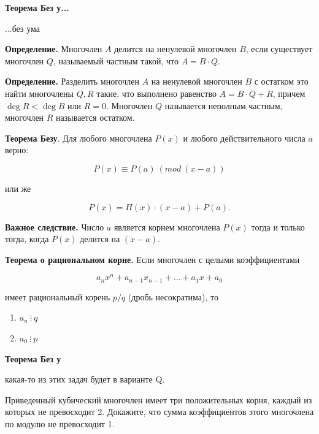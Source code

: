 \centerline{\bf \Huge Теорема Без у...}
\centerline{\bf \Huge }

\begin{flushright}
        \scriptsize{...без ума}
\end{flushright}

\textbf{Определение.} Многочлен $A$ делится на ненулевой многочлен $B$, если существует многочлен $Q$, называемый частным такой, что $A=B \cdot Q$.

\textbf{Определение.} Разделить многочлен $A$ на ненулевой многочлен $B$ с остатком это найти многочлены $Q, R$ такие, что выполнено равенство $A=B \cdot Q+R$, причем $\operatorname{deg} R<\operatorname{deg} B$ или $R=0$. Многочлен $Q$ называется неполным частным, многочлен $R$ называется остатком.

\textbf{Теорема Безу}. Для любого многочлена $P(x)$ и любого действительного числа $a$ верно:

$$
P(x) \equiv P(a) \ (mod \ (x-a))
$$

или же 

$$
P(x)=H(x) \cdot(x-a)+P(a) .
$$


\textbf{Важное следствие.} Число $a$ является корнем многочлена $P(x)$ тогда и только тогда, когда $P(x)$ делится на $(x-a)$.

\textbf{Теорема о рациональном корне.} Если многочлен с целыми коэффициентами

$$
a_n x^n+a_{n-1}x_{n-1}+\ldots+a_{1} x+a_0
$$


имеет рациональный корень $p / q$ (дробь несократима), то 

\begin{enumerate}
    \item $a_n \ \vdots \ q$
    \item $a_0 \ \vdots \ p$
\end{enumerate}


\newpage

\hspace{3mm}

\centerline{\bf \Huge Теорема Без у}

\begin{flushright}
        \scriptsize{какая-то из этих задач будет в варианте Q.}
\end{flushright}

Приведенный кубический многочлен имеет три положительных корня, каждый из которых не превосходит 2. Докажите, что сумма коэффициентов этого многочлена по модулю не превосходит 1.

